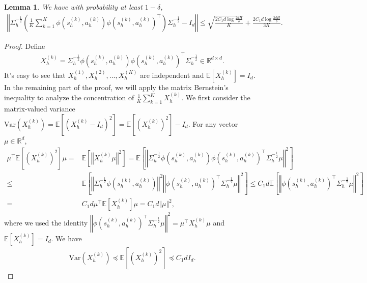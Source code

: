 \documentclass{article}
\newtheorem{lemma}{Lemma}[section]
\numberwithin{equation}{section}
\begin{document}
\begin{lemma}
\label{dsig1}
We have with probability at least $1-\delta$,
\begin{align*}
\left\Vert\Sigma_h^{-\frac{1}{2}}\left(\frac{1}{K}\sum_{k=1}^K\phi(s_h^{(k)}, a_h^{(k)})\phi(s_h^{(k)},a_h^{(k)})^\top\right)\Sigma^{-\frac{1}{2}}_h-I_d\right\Vert\leq \sqrt{\frac{2C_1d\log\frac{2dH}{\delta}}{K}} + \frac{2C_1d\log\frac{2dH}{\delta}}{3K}.
\end{align*}
\end{lemma}
\begin{proof}
Define
\begin{align*}
	X^{(k)}_h=\Sigma^{-\frac{1}{2}}_h\phi\left(s^{(k)}_h,a^{(k)}_h\right) \phi\left(s^{(k)}_h,a^{(k)}_h\right)^\top\Sigma_h^{-\frac{1}{2}}\in\mathbb{R}^{d\times d}.
\end{align*}
It's easy to see that $X^{(1)}_h,X^{(2)}_h,\ldots,X^{(K)}_h$ are independent and $\mathbb{E}\left[X^{(k)}_h\right]=I_d$. In the remaining part of the proof, we will apply the matrix Bernstein's inequality to analyze the concentration of $\frac{1}{K}\sum_{k=1}^K X^{(k)}_h$. We first consider the matrix-valued variance $\textrm{Var}\left(X^{(k)}_h\right)=\mathbb{E}\left[\left(X^{(k)}_h-I_d\right)^2\right]=\mathbb{E}\left[\left(X^{(k)}_h\right)^2\right]-I_d$. For any vector $\mu\in\mathbb{R}^d$,
\begin{align*} 
	\mu^\top\mathbb{E}\left[\left(X_h^{(k)}\right)^2\right]\mu=&\mathbb{E}\left[\left\Vert X_h^{(k)}\mu\right\Vert^2\right]=\mathbb{E}\left[\left\Vert\Sigma^{-\frac{1}{2}}_h\phi\left(s^{(k)}_h,a^{(k)}_h\right)\phi\left(s^{(k)}_h,a^{(k)}_h\right)^\top\Sigma_h^{-\frac{1}{2}}\mu\right\Vert^2\right]\\
	\leq&\mathbb{E}\left[\left\Vert\Sigma_h^{-\frac{1}{2}}\phi\left(s^{(k)}_h,a^{(k)}_h\right)\right\Vert^2\left\Vert\phi\left(s^{(k)}_h,a^{(k)}_h\right)^\top\Sigma_h^{-\frac{1}{2}}\mu\right\Vert^2\right]\leq C_1d\mathbb{E}\left[\left\Vert\phi\left(s^{(k)}_h,a^{(k)}_h\right)^\top\Sigma_h^{-\frac{1}{2}}\mu\right\Vert^2\right]\\
    =&C_1d\mu^\top\mathbb{E}\left[X_h^{(k)}\right]\mu = C_1d \Vert\mu\Vert^2,
\end{align*}
where we used the identity $\left\Vert\phi\left(s^{(k)}_h,a^{(k)}_h\right)^\top\Sigma_h^{-\frac{1}{2}}\mu\right\Vert^2=\mu^\top X_h^{(k)}\mu$ and $\mathbb{E}\left[X_h^{(k)}\right]=I_d$. We have
\begin{align*}
    \textrm{Var}(X_h^{(k)})\preceq\mathbb{E}\left[\left(X_h^{(k)}\right)^2\right]\preceq C_1dI_d. 
\end{align*}

\end{proof}
\end{document}
